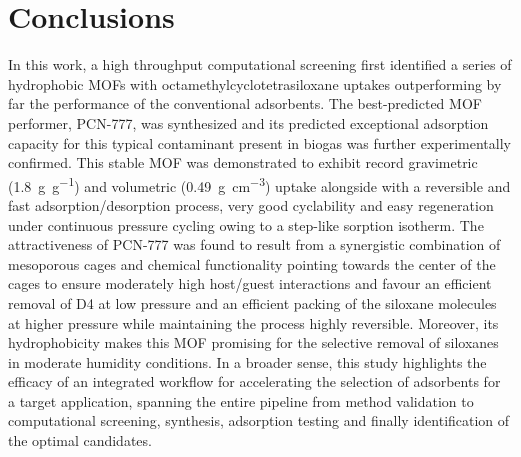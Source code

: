 \section{Conclusions}\label{conclusions}

In this work, a high throughput computational screening first identified a
series of hydrophobic MOFs with octamethylcyclotetrasiloxane uptakes
outperforming by far the performance of the conventional adsorbents. The
best-predicted MOF performer, PCN-777, was synthesized and its predicted
exceptional adsorption capacity for this typical contaminant present in biogas
was further experimentally confirmed. This stable MOF was demonstrated to
exhibit record gravimetric (\SI{1.8}{\gram\per\gram}) and volumetric
(\SI{0.49}{\gram\per\centi\metre\cubed}) uptake alongside with a reversible and
fast adsorption/desorption process, very good cyclability and easy regeneration
under continuous pressure cycling owing to a step-like sorption isotherm. The
attractiveness of PCN-777 was found to result from a synergistic combination of
mesoporous cages and chemical functionality pointing towards the center of the
cages to ensure moderately high host/guest interactions and favour an efficient
removal of D4 at low pressure and an efficient packing of the siloxane molecules
at higher pressure while maintaining the process highly reversible. Moreover,
its hydrophobicity makes this MOF promising for the selective removal of
siloxanes in moderate humidity conditions. In a broader sense, this study
highlights the efficacy of an integrated workflow for accelerating the selection
of adsorbents for a target application, spanning the entire pipeline from method
validation to computational screening, synthesis, adsorption testing and finally
identification of the optimal candidates.
